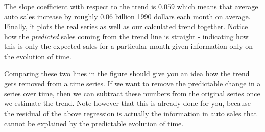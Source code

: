 \documentclass[
]{book}
\newenvironment{Shaded}{\begin{snugshade}}{\end{snugshade}}
\newcommand{\AttributeTok}[1]{\textcolor[rgb]{0.13,0.29,0.53}{#1}}
\newcommand{\ConstantTok}[1]{\textcolor[rgb]{0.56,0.35,0.01}{#1}}
\newcommand{\DecValTok}[1]{\textcolor[rgb]{0.00,0.00,0.81}{#1}}
\newcommand{\FunctionTok}[1]{\textcolor[rgb]{0.13,0.29,0.53}{\textbf{#1}}}
\newcommand{\NormalTok}[1]{#1}
\newcommand{\OtherTok}[1]{\textcolor[rgb]{0.56,0.35,0.01}{#1}}
\newcommand{\SpecialCharTok}[1]{\textcolor[rgb]{0.81,0.36,0.00}{\textbf{#1}}}
\newcommand{\StringTok}[1]{\textcolor[rgb]{0.31,0.60,0.02}{#1}}
\begin{document}
The slope coefficient with respect to the trend is \(0.059\) which means that average auto sales increase by roughly \(0.06\) billion 1990 dollars each month on average. Finally, it plots the real series as well as our calculated trend together. Notice how the \emph{predicted} sales coming from the trend line is straight - indicating how this is only the expected sales for a particular month given information only on the evolution of time.

Comparing these two lines in the figure should give you an idea how the trend gets removed from a time series. If we want to remove the predictable change in a series over time, then we can subtract these numbers from the original series once we estimate the trend. Note however that this is already done for you, because the residual of the above regression is actually the information in auto sales that cannot be explained by the predictable evolution of time.

\begin{Shaded}
\end{Shaded}
\end{document}
